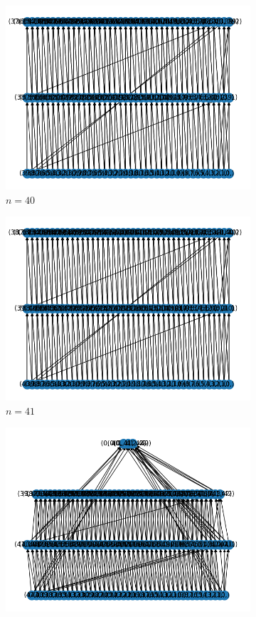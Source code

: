 \begin{figure}[h]
    \begin{subfigure}{.5\textwidth}
      \centering
      \includegraphics[width=.8\linewidth]{40.png}
      \caption{$n = 40$}
    \end{subfigure}%
    \begin{subfigure}{.5\textwidth}
      \centering
      \includegraphics[width=.8\linewidth]{41.png}
      \caption{$ n = 41 $}
    \end{subfigure}
    \begin{subfigure}{.5\textwidth}
        \centering
        \includegraphics[width=.8\linewidth]{42.png}

\end{subfigure}
\end{figure}

